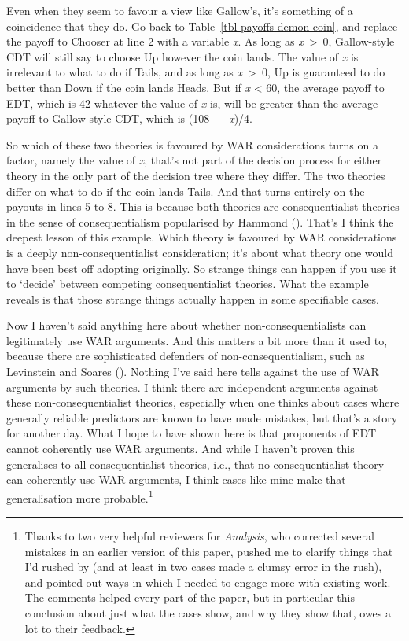\documentclass[
  10pt,
  letterpaper,
  DIV=11,
  numbers=noendperiod,
  twoside]{scrartcl}
\begin{document}
Even when they seem to favour a view like Gallow's, it's something of a
coincidence that they do. Go back to Table~\ref{tbl-payoffs-demon-coin},
and replace the payoff to Chooser at line 2 with a variable \emph{x}. As
long as \emph{x}~\textgreater~0, Gallow-style CDT will still say to
choose Up however the coin lands. The value of \emph{x} is irrelevant to
what to do if Tails, and as long as \emph{x}~\textgreater~0, Up is
guaranteed to do better than Down if the coin lands Heads. But if
\emph{x} \textless{} 60, the average payoff to EDT, which is 42 whatever
the value of \emph{x} is, will be greater than the average payoff to
Gallow-style CDT, which is (108~+~\emph{x})/4.

So which of these two theories is favoured by WAR considerations turns
on a factor, namely the value of \emph{x}, that's not part of the
decision process for either theory in the only part of the decision tree
where they differ. The two theories differ on what to do if the coin
lands Tails. And that turns entirely on the payouts in lines 5 to 8.
This is because both theories are consequentialist theories in the sense
of consequentialism popularised by Hammond
(). That's I think the deepest lesson of
this example. Which theory is favoured by WAR considerations is a deeply
non-consequentialist consideration; it's about what theory one would
have been best off adopting originally. So strange things can happen if
you use it to `decide' between competing consequentialist theories. What
the example reveals is that those strange things actually happen in some
specifiable cases.

Now I haven't said anything here about whether non-consequentialists can
legitimately use WAR arguments. And this matters a bit more than it used
to, because there are sophisticated defenders of non-consequentialism,
such as Levinstein and Soares
(). Nothing I've said here
tells against the use of WAR arguments by such theories. I think there
are independent arguments against these non-consequentialist theories,
especially when one thinks about cases where generally reliable
predictors are known to have made mistakes, but that's a story for
another day. What I hope to have shown here is that proponents of EDT
cannot coherently use WAR arguments. And while I haven't proven this
generalises to all consequentialist theories, i.e., that no
consequentialist theory can coherently use WAR arguments, I think cases
like mine make that generalisation more probable.\footnote{Thanks to two
  very helpful reviewers for \emph{Analysis}, who corrected several
  mistakes in an earlier version of this paper, pushed me to clarify
  things that I'd rushed by (and at least in two cases made a clumsy
  error in the rush), and pointed out ways in which I needed to engage
  more with existing work. The comments helped every part of the paper,
  but in particular this conclusion about just what the cases show, and
  why they show that, owes a lot to their feedback.}
\end{document}
